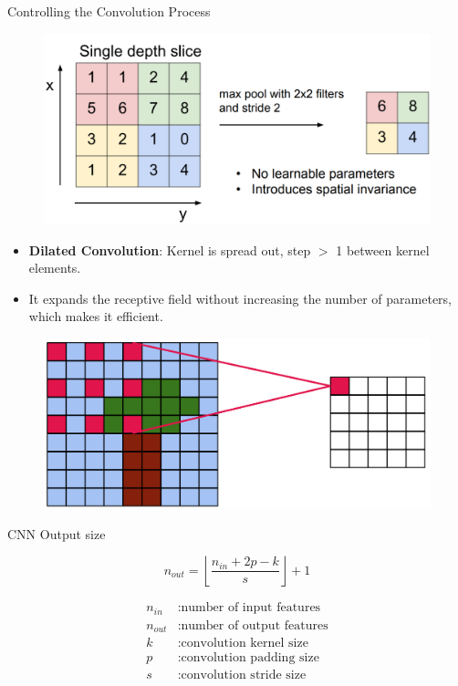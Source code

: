 \documentclass[10pt]{beamer}
\theoremstyle{remark}
\theoremstyle{definition}
\begin{document}
\begin{frame}[allowframebreaks]{Controlling the Convolution Process}
\begin{figure}
\centering
\includegraphics[width=1.0\textwidth,height=0.8\textheight,keepaspectratio]{./images/pool_2.png}
\end{figure}
    
\framebreak

\begin{itemize}
    \item \textbf{Dilated Convolution}: Kernel is spread out, step $>$ 1 between kernel elements.
    \item It expands the receptive field without increasing the number of parameters, which makes it efficient.
\end{itemize}


\begin{figure}
\centering
\includegraphics[width=1.0\textwidth,height=0.8\textheight,keepaspectratio]{./images/dilated.png}
\end{figure}

\end{frame}

\begin{frame}[allowframebreaks]{CNN Output size}


\[
n_{out} = \left\lfloor \frac{n_{in} + 2p - k}{s} \right\rfloor + 1
\]

\begin{align*}
n_{in} &: \text{number of input features} \\
n_{out} &: \text{number of output features} \\
k &: \text{convolution kernel size} \\
p &: \text{convolution padding size} \\
s &: \text{convolution stride size}
\end{align*}


\end{frame}
\end{document}

